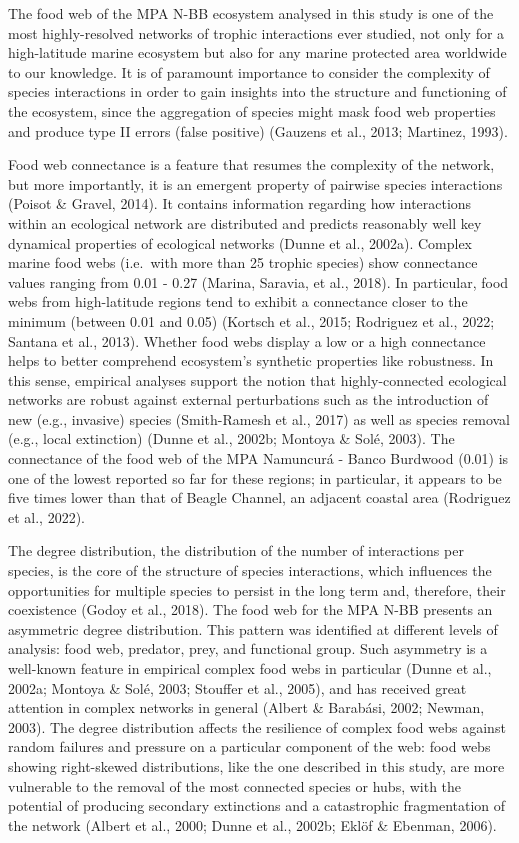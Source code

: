 \documentclass[preprint, 3p,
authoryear]{elsarticle} %
\begin{document}
The food web of the MPA N-BB ecosystem analysed in this study is one of
the most highly-resolved networks of trophic interactions ever studied,
not only for a high-latitude marine ecosystem but also for any marine
protected area worldwide to our knowledge. It is of paramount importance
to consider the complexity of species interactions in order to gain
insights into the structure and functioning of the ecosystem, since the
aggregation of species might mask food web properties and produce type
II errors (false positive) (Gauzens et al., 2013; Martinez, 1993).

Food web connectance is a feature that resumes the complexity of the
network, but more importantly, it is an emergent property of pairwise
species interactions (Poisot \& Gravel, 2014). It contains information
regarding how interactions within an ecological network are distributed
and predicts reasonably well key dynamical properties of ecological
networks (Dunne et al., 2002a). Complex marine food webs (i.e.~with more
than 25 trophic species) show connectance values ranging from 0.01 -
0.27 (Marina, Saravia, et al., 2018). In particular, food webs from
high-latitude regions tend to exhibit a connectance closer to the
minimum (between 0.01 and 0.05) (Kortsch et al., 2015; Rodriguez et al.,
2022; Santana et al., 2013). Whether food webs display a low or a high
connectance helps to better comprehend ecosystem's synthetic properties
like robustness. In this sense, empirical analyses support the notion
that highly-connected ecological networks are robust against external
perturbations such as the introduction of new (e.g., invasive) species
(Smith-Ramesh et al., 2017) as well as species removal (e.g., local
extinction) (Dunne et al., 2002b; Montoya \& Solé, 2003). The
connectance of the food web of the MPA Namuncurá - Banco Burdwood (0.01)
is one of the lowest reported so far for these regions; in particular,
it appears to be five times lower than that of Beagle Channel, an
adjacent coastal area (Rodriguez et al., 2022).

The degree distribution, the distribution of the number of interactions
per species, is the core of the structure of species interactions, which
influences the opportunities for multiple species to persist in the long
term and, therefore, their coexistence (Godoy et al., 2018). The food
web for the MPA N-BB presents an asymmetric degree distribution. This
pattern was identified at different levels of analysis: food web,
predator, prey, and functional group. Such asymmetry is a well-known
feature in empirical complex food webs in particular (Dunne et al.,
2002a; Montoya \& Solé, 2003; Stouffer et al., 2005), and has received
great attention in complex networks in general (Albert \& Barabási,
2002; Newman, 2003). The degree distribution affects the resilience of
complex food webs against random failures and pressure on a particular
component of the web: food webs showing right-skewed distributions, like
the one described in this study, are more vulnerable to the removal of
the most connected species or hubs, with the potential of producing
secondary extinctions and a catastrophic fragmentation of the network
(Albert et al., 2000; Dunne et al., 2002b; Eklöf \& Ebenman, 2006).
\end{document}

